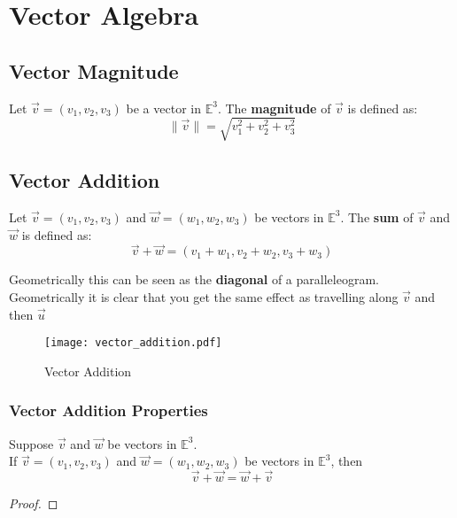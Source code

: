 \section{Vector Algebra}

\subsection{Vector Magnitude}

\begin{definition}
  Let $\vec{v} = (v_1, v_2, v_3)$ be a vector in $\mathbb{E}^3$. The \textbf{magnitude} of $\vec{v}$ is defined as:
  \begin{equation}
    \|\vec{v}\| = \sqrt{v_1^2 + v_2^2 + v_3^2}
  \end{equation}
\end{definition}

\subsection{Vector Addition}

\begin{definition}
  Let $\vec{v} = (v_1, v_2, v_3)$ and $\vec{w} = (w_1, w_2, w_3)$ be vectors in $\mathbb{E}^3$. The \textbf{sum} of $\vec{v}$ and $\vec{w}$ is defined as:
  \begin{equation}
    \vec{v} + \vec{w} = (v_1 + w_1, v_2 + w_2, v_3 + w_3)
  \end{equation}
\end{definition}

Geometrically this can be seen as the {\bf diagonal} of a paralleleogram. Geometrically it is clear that you get the same effect as travelling along $\vec{v}$ and then $\vec{u}$

\begin{figure}[H]
\centering
   \texttt{[image: vector\_addition.pdf]}
   \caption{Vector Addition} 
   \label{fig:figure-2-vector-addition}
\end{figure}

\clearpage

\subsubsection*{Vector Addition Properties}
\vspace{5px}
 
\begin{theorem}[Commutativity]
Suppose $\vec{v}$ and $\vec{w}$ be vectors in $\mathbb{E}^3$.\\
  If $\vec{v} = \left( v_1, v_2, v_3 \right)$ and $\vec{w} = \left(w_1, w_2, w_3 \right)$ be vectors in $\mathbb{E}^{3}$, then
  \begin{equation}
      \vec{v} + \vec{w} = \vec{w} + \vec{v}    
  \end{equation}
\end{theorem}
\begin{proof}
  
\end{proof}

